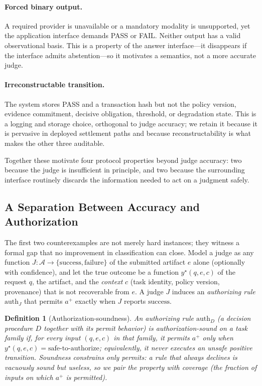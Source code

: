 \documentclass[sigconf,anonymous,review]{acmart}
\newtheorem{definition}{Definition}
\begin{document}
\paragraph{Forced binary output.} A required provider is unavailable or a mandatory modality is unsupported, yet the application interface demands PASS or FAIL. Neither output has a valid observational basis. This is a property of the answer interface---it disappears if the interface admits abstention---so it motivates a semantics, not a more accurate judge.

\paragraph{Irreconstructable transition.} The system stores PASS and a transaction hash but not the policy version, evidence commitment, decisive obligation, threshold, or degradation state. This is a logging and storage choice, orthogonal to judge accuracy; we retain it because it is pervasive in deployed settlement paths and because reconstructability is what makes the other three auditable.

Together these motivate four protocol properties beyond judge accuracy: two because the judge is insufficient in principle, and two because the surrounding interface routinely discards the information needed to act on a judgment safely.

\subsection{A Separation Between Accuracy and Authorization}
The first two counterexamples are not merely hard instances; they witness a formal gap that no improvement in classification can close. Model a judge as any function $J:\mathcal{A}\to\{\mathrm{success},\mathrm{failure}\}$ of the submitted artifact $e$ alone (optionally with confidence), and let the true outcome be a function $y^\star(q,e,c)$ of the request $q$, the artifact, and the \emph{context} $c$ (task identity, policy version, provenance) that is not recoverable from $e$. A judge $J$ induces an \emph{authorizing rule} $\mathrm{auth}_J$ that permits $a^+$ exactly when $J$ reports $\mathrm{success}$.

\begin{definition}[Authorization-soundness]
\label{def:authsound}
An authorizing rule $\mathrm{auth}_D$ (a decision procedure $D$ together with its permit behavior) is \emph{authorization-sound} on a task family if, for every input $(q,e,c)$ in that family, it permits $a^+$ only when $y^\star(q,e,c)=\text{safe-to-authorize}$; equivalently, it never executes an unsafe positive transition. Soundness constrains only permits: a rule that always declines is vacuously sound but useless, so we pair the property with coverage (the fraction of inputs on which $a^+$ is permitted).
\end{definition}
\end{document}
